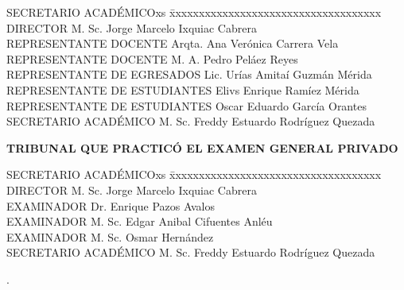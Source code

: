 {\doublespacing{}
\begin{tabbing}
  SECRETARIO ACADÉMICOxs \= xxxxxxxxxxxxxxxxxxxxxxxxxxxxxxxxxxxx  \kill
  DIRECTOR \> \hspace{60pt} M. Sc. Jorge Marcelo Ixquiac Cabrera \\
  REPRESENTANTE DOCENTE \>  \hspace{60pt} Arqta. Ana Verónica Carrera Vela\\
  REPRESENTANTE DOCENTE \>  \hspace{60pt} M. A. Pedro Peláez Reyes\\
  REPRESENTANTE DE EGRESADOS \>  \hspace{60pt} Lic. Urías Amitaí Guzmán Mérida\\
  REPRESENTANTE DE ESTUDIANTES \>  \hspace{60pt} Elivs Enrique Ramíez Mérida\\
  REPRESENTANTE DE ESTUDIANTES \> \hspace{60pt} Oscar Eduardo García Orantes\\
  SECRETARIO ACADÉMICO\>  \hspace{60pt} M. Sc. Freddy Estuardo Rodríguez Quezada\\
\end{tabbing}

\vspace{24pt}

\begin{center}
\textbf{TRIBUNAL QUE PRACTICÓ EL EXAMEN GENERAL PRIVADO}
\end{center}

\begin{tabbing}
  SECRETARIO ACADÉMICOxs \= xxxxxxxxxxxxxxxxxxxxxxxxxxxxxxxxxxxx  \kill
  DIRECTOR \> \hspace{60pt} M. Sc. Jorge Marcelo Ixquiac Cabrera \\
  EXAMINADOR \> \hspace{60pt} Dr\@. Enrique Pazos Avalos\\
  EXAMINADOR \>  \hspace{60pt} M. Sc. Edgar Anibal Cifuentes Anléu  \\
  EXAMINADOR \>  \hspace{60pt} M. Sc. Osmar Hernández \\
  SECRETARIO ACADÉMICO \> \hspace{60pt} M. Sc. Freddy Estuardo Rodríguez Quezada
\end{tabbing}
\par}

\newpage
\textcolor[rgb]{1,1,1}{.} 

\thispagestyle{empty}
\newpage